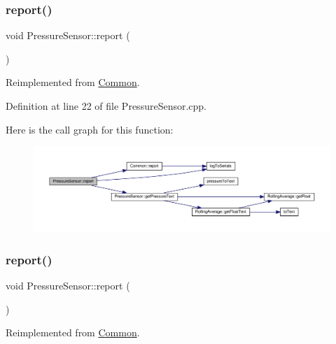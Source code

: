 \subsubsection{\texorpdfstring{report()}{report()}\hspace{0.1cm}{\footnotesize\ttfamily [1/2]}}
{\footnotesize\ttfamily void Pressure\+Sensor\+::report (\begin{DoxyParamCaption}{ }\end{DoxyParamCaption})\hspace{0.3cm}{\ttfamily [virtual]}}



Reimplemented from \hyperlink{class_common_a9e60e2c26a5f4d72342a59a969954636}{Common}.



Definition at line 22 of file Pressure\+Sensor.\+cpp.

Here is the call graph for this function\+:
\nopagebreak
\begin{figure}[H]
\begin{center}
\leavevmode
\includegraphics[width=350pt]{class_pressure_sensor_ae9f360e068bc30f611ba50c7c9cf7e4a_cgraph}
\end{center}
\end{figure}
\mbox{\label{class_pressure_sensor_ae9f360e068bc30f611ba50c7c9cf7e4a}} 
\subsubsection{\texorpdfstring{report()}{report()}\hspace{0.1cm}{\footnotesize\ttfamily [2/2]}}
{\footnotesize\ttfamily void Pressure\+Sensor\+::report (\begin{DoxyParamCaption}{ }\end{DoxyParamCaption})\hspace{0.3cm}{\ttfamily [virtual]}}



Reimplemented from \hyperlink{class_common_a9e60e2c26a5f4d72342a59a969954636}{Common}.

